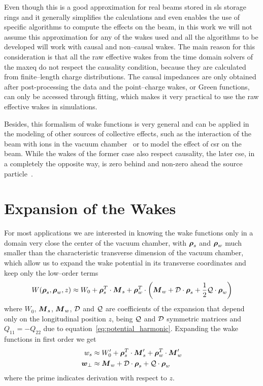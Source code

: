     Even though this is a good approximation for real beams stored in \gls{sls} storage rings and it generally simplifies the calculations and even enables the use of specific algorithms to compute the effects on the beam, in this work we will not assume this approximation for any of the wakes used and all the algorithms to be developed will work with causal and non--causal wakes. The main reason for this consideration is that all the raw effective wakes from the time domain solvers of the \gls{maxeq} do not respect the causality condition, because they are calculated from finite--length charge distributions. The causal impedances are only obtained after post-processing the data and the point--charge wakes, or Green functions, can only be accessed through fitting, which makes it very practical to use the raw effective wakes in simulations.

    Besides, this formalism of wake functions is very general and can be applied in the modeling of other sources of collective effects, such as the interaction of the beam with ions in the vacuum chamber~\cite{Wang2013a} or to model the effect of \gls{csr} on the beam. While the wakes of the former case also respect causality, the later cse, in a completely the opposite way, is zero behind and non-zero ahead the source particle~\cite{Derbenev1995}.

\section{Expansion of the Wakes}

    For most applications we are interested in knowing the wake functions only in a domain very close the center of the vacuum chamber, with $\boldsymbol{\rho}_s$ and $\boldsymbol{\rho}_w$ much smaller than the characteristic transverse dimension of the vacuum chamber, which allow us to expand the wake potential in its transverse coordinates and keep only the low--order terms
    \begin{align}\label{eq:wake_potential_expansion}
      	W(\boldsymbol{\rho}_s, \boldsymbol{\rho}_w, z) \approx W_0 +
	  	\boldsymbol{\rho}_s^T\cdot\boldsymbol{M}_s +
        \boldsymbol{\rho}_w^T\cdot\left(\boldsymbol{M}_w +
	  	                         \mathcal{D}\cdot\boldsymbol{\rho}_s +
	  	                         \frac12\mathcal{Q}\cdot\boldsymbol{\rho}_w\right)
    \end{align}
    where $W_0$, $\boldsymbol{M}_s$, $\boldsymbol{M}_w$, $\mathcal{D}$ and $\mathcal{Q}$ are coefficients of the expansion that depend only on the longitudinal position $z$, being $\mathcal{Q}$ and $\mathcal{D}$ symmetric matrices and $Q_{11}=-Q_{22}$ due to equation~\eqref{eq:potential_harmonic}. Expanding the wake functions in first order we get
    \begin{align}\label{eq:wake_functions_expansion}
      	w_s &\approx W'_0 + \boldsymbol{\rho}_s^T\cdot\boldsymbol{M}'_s + \boldsymbol{\rho}_w^T\cdot\boldsymbol{M}'_w \\
	  	\boldsymbol{w}_\perp &\approx \boldsymbol{M}_w + \mathcal{D}\cdot\boldsymbol{\rho}_s + \mathcal{Q}\cdot\boldsymbol{\rho}_w
    \end{align}
    where the prime indicates derivation with respect to $z$.

